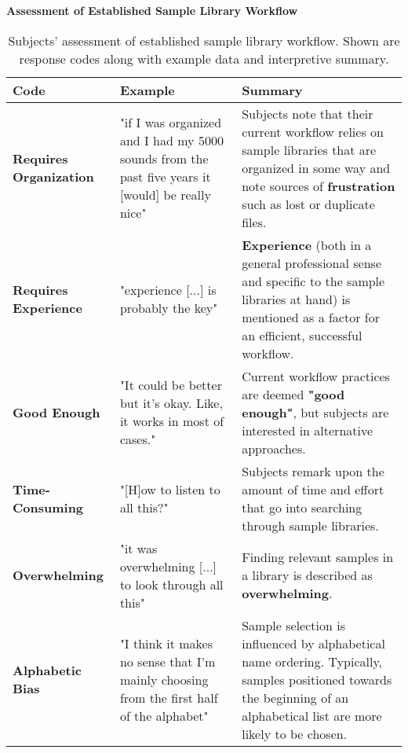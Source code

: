 


\begin{table}[!htb]
  \renewcommand{\arraystretch}{1.2}
  \centering
  \textbf{Assessment of Established Sample Library Workflow} \\ [3mm]
  \footnotesize
  \colorbox{light-bg}{
  \begin{tabular}{ p{4.0cm} p{4.75cm} p{4.75cm} }
  \hline
    \textbf{Code} & \textbf{Example} & \textbf{Summary} \\
    \hline
    \textbf{Requires Organization}
    &
    "if I was organized and I had my 5000 sounds from the past five years it
    [would] be really nice"
    &
    Subjects note that their current workflow relies on sample libraries that
    are organized in some way and note sources of \textbf{frustration} such as
    lost or duplicate files.
    \\
    \textbf{Requires Experience}
    &
    "experience [...] is probably the key"
    &
    \textbf{Experience} (both in a general professional sense and specific to
    the sample libraries at hand) is mentioned as a factor for an efficient,
    successful workflow.
    \\
    \textbf{Good Enough}
    &
    "It could be better but it's okay. Like, it works in most of cases."
    &
    Current workflow practices are deemed \textbf{"good enough"}, but subjects
    are interested in alternative approaches.
    \\
    \textbf{Time-Consuming}
    &
    "[H]ow to listen to all this?"
    &
    Subjects remark upon the amount of time and effort that go into searching
    through sample libraries.
    \\
    \textbf{Overwhelming}
    &
    "it was overwhelming [...] to look through all this"
    &
    Finding relevant samples in a library is described as \textbf{overwhelming}.
    \\
    \textbf{Alphabetic Bias}
    &
    "I think it makes no sense that I'm mainly choosing from the first half of
    the alphabet"
    &
    Sample selection is influenced by alphabetical name ordering. Typically,
    samples positioned towards the beginning of an alphabetical list are more
    likely to be chosen.
    \\
  \end{tabular}}
  \caption[Established Sample Library Workflow Assessment: Response Codes]
  {Subjects' assessment of established sample library workflow. Shown are
  response codes along with example data and interpretive summary.}
  \label{table:current_workflow_assessment}
\end{table}

